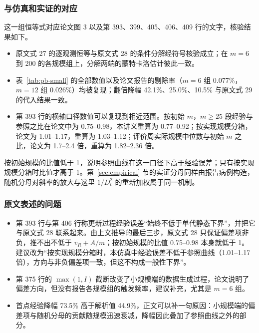 \subsubsection{与仿真和实证的对应}

这一组恒等式对应论文图 3 以及第 393、399、405、406、409 行的文字，核验结果如下。
\begin{itemize}
\item 原文式 27 的逐观测恒等与原文式 28 的条件分解经符号核验成立；在 $m=6$ 到 200 的各规模组上，分解两端的蒙特卡洛估计彼此一致。
\item 表~\ref{tab:pb-small} 的全部数值以及论文报告的剔除率（$m=6$ 组 0.077\%，$m=12$ 组 0.026\%）均被复现；翻倍降幅 42.1\%、25.0\%、10.5\% 与原文式 29 的代入结果一致。
\item 第 393 行的横轴口径数值可以复现到相近范围。按初始 $m$，$m\ge25$ 段经验与参照之比在论文中为 0.75–0.98，本讲义重算为 0.77–0.92；按实现规模分箱，论文为 1.01–1.17，重算为 1.03–1.12；评价周实际规模中位数与初始 $m$ 之比，论文为 1.7–2.4 倍，重算为 1.82–2.36 倍。
\end{itemize}
按初始规模的比值低于 1，说明参照曲线在这一口径下高于经验误差；只有按实现规模分箱时比值才高于 1。第~\ref{sec:empirical} 节的实证分母同样由报告病例构造，随机分母对斜率的放大与这里 $1/D_t^2$ 的重新加权属于同一机制。

\subsubsection{原文表述的问题}

\begin{itemize}
\item 第 393 行与第 406 行称更新过程经验误差“始终不低于单代静态下界”，并把它与原文式 28 联系起来。由上文推导的最后三步，原文式 28 只保证偏差项非负，推不出不低于 $v_R+A/m$；按初始规模的比值 0.75–0.98 本身就低于 1。建议改为“按实现规模分箱时，本仿真中经验误差不低于参照曲线（1.01–1.17 倍），方向与非负偏差项一致，但这不构成一般性下界”。
\item 第 375 行的 $\max(1,I)$ 截断改变了小规模端的数据生成过程，论文说明了偏差方向，但没有报告各规模组的触发频率，建议补充，尤其是 $m=6$ 组。
\item 首点经验降幅 73.5\% 高于解析值 44.9\%，正文可以补一句原因：小规模端的偏差项与随机分母的贡献随规模迅速衰减，降幅因此叠加了参照曲线之外的部分。
\end{itemize}
